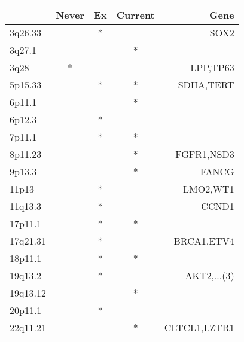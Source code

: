 \begin{tabular}{lcccr}
\toprule
{} & Never & Ex & Current &          Gene \\
\midrule
3q26.33  &       &  * &         &          SOX2 \\
3q27.1   &       &    &       * &               \\
3q28     &     * &    &         &      LPP,TP63 \\
5p15.33  &       &  * &       * &     SDHA,TERT \\
6p11.1   &       &    &       * &               \\
6p12.3   &       &  * &         &               \\
7p11.1   &       &  * &       * &               \\
8p11.23  &       &    &       * &    FGFR1,NSD3 \\
9p13.3   &       &    &       * &         FANCG \\
11p13    &       &  * &         &      LMO2,WT1 \\
11q13.3  &       &  * &         &         CCND1 \\
17p11.1  &       &  * &       * &               \\
17q21.31 &       &  * &         &    BRCA1,ETV4 \\
18p11.1  &       &  * &       * &               \\
19q13.2  &       &  * &         &   AKT2,...(3) \\
19q13.12 &       &    &       * &               \\
20p11.1  &       &  * &         &               \\
22q11.21 &       &    &       * &  CLTCL1,LZTR1 \\
\bottomrule
\end{tabular}
